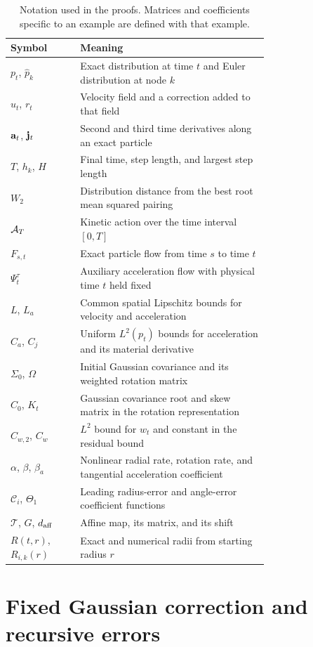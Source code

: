 \begin{table}[ht]
\centering
\caption{Notation used in the proofs. Matrices and coefficients specific to an example are defined with that example.}
\label{tab:notation}
\begin{tabular}{lp{0.73\linewidth}}
\toprule
Symbol & Meaning\\
\midrule
$p_t$, $\widehat p_k$ & Exact distribution at time $t$ and Euler distribution at node $k$\\
$u_t$, $r_t$ & Velocity field and a correction added to that field\\
$\mathbf a_t$, $\mathbf j_t$ & Second and third time derivatives along an exact particle\\
$T$, $h_k$, $H$ & Final time, step length, and largest step length\\
$W_2$ & Distribution distance from the best root mean squared pairing\\
$\mathcal A_T$ & Kinetic action over the time interval $[0,T]$\\
$F_{s,t}$ & Exact particle flow from time $s$ to time $t$\\
$\Psi_t^\tau$ & Auxiliary acceleration flow with physical time $t$ held fixed\\
$L$, $L_a$ & Common spatial Lipschitz bounds for velocity and acceleration\\
$C_a$, $C_j$ & Uniform $L^2(p_t)$ bounds for acceleration and its material derivative\\
$\Sigma_0$, $\Omega$ & Initial Gaussian covariance and its weighted rotation matrix\\
$C_0$, $K_t$ & Gaussian covariance root and skew matrix in the rotation representation\\
$C_{w,2}$, $C_w$ & $L^2$ bound for $w_t$ and constant in the residual bound\\
$\alpha$, $\beta$, $\beta_a$ & Nonlinear radial rate, rotation rate, and tangential acceleration coefficient\\
$\mathcal C_i$, $\Theta_1$ & Leading radius-error and angle-error coefficient functions\\
$\mathcal T$, $G$, $d_{\rm aff}$ & Affine map, its matrix, and its shift\\
$R(t,r)$, $R_{i,k}(r)$ & Exact and numerical radii from starting radius $r$\\
\bottomrule
\end{tabular}
\end{table}
\FloatBarrier

\section{Fixed Gaussian correction and recursive errors}
\label{app:fixed-gaussian}

